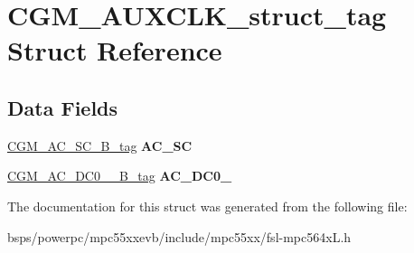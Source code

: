 \hypertarget{structCGM__AUXCLK__struct__tag}{}\section{C\+G\+M\+\_\+\+A\+U\+X\+C\+L\+K\+\_\+struct\+\_\+tag Struct Reference}
\label{structCGM__AUXCLK__struct__tag}
\subsection*{Data Fields}
\begin{DoxyCompactItemize}
\item 
\mbox{\label{structCGM__AUXCLK__struct__tag_aceb856075b50383b16fe72859fbd42b3}} 
\mbox{\hyperlink{unionCGM__AC__SC__32B__tag}{C\+G\+M\+\_\+\+A\+C\+\_\+\+S\+C\+\_\+B\+\_\+tag}} {\bfseries A\+C\+\_\+\+SC}
\item 
\mbox{\label{structCGM__AUXCLK__struct__tag_a810edddb463a71fd73bbd3e16df7b732}} 
\mbox{\hyperlink{unionCGM__AC__DC0__3__32B__tag}{C\+G\+M\+\_\+\+A\+C\+\_\+\+D\+C0\+\_\+\_\+B\+\_\+tag}} {\bfseries A\+C\+\_\+\+D\+C0\+\_}
\end{DoxyCompactItemize}


The documentation for this struct was generated from the following file\+:\begin{DoxyCompactItemize}
\item 
bsps/powerpc/mpc55xxevb/include/mpc55xx/fsl-\/mpc564x\+L.\+h\end{DoxyCompactItemize}
